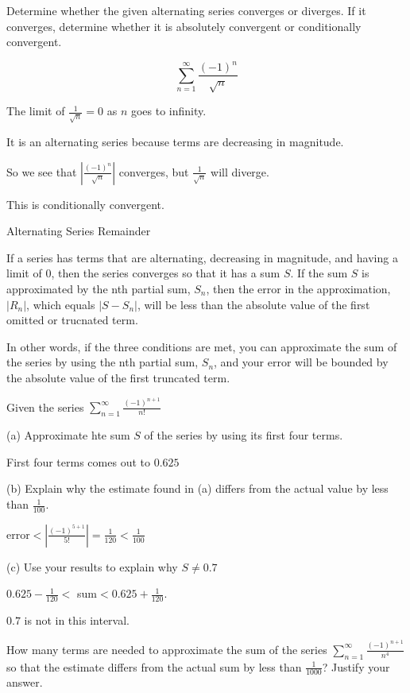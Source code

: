 \documentclass[../bccalc.tex]{subfiles}
\begin{document}
\pagebreak
\begin{example}
    Determine whether the given alternating series converges or diverges. If it converges, determine whether it is absolutely convergent or conditionally convergent.

    \[ \sum_{n=1}^{\infty}\frac{(-1)^n}{\sqrt{n}} \]

    The limit of $\frac{1}{\sqrt{n}}=0$ as $n$ goes to infinity.

    It is an alternating series because terms are decreasing in magnitude.

    So we see that $\left| \frac{(-1)^n}{\sqrt{n}}\right|$ converges, but $\frac{1}{\sqrt{n}}$ will diverge.

    This is conditionally convergent.
\end{example}

Alternating Series Remainder 

If a series has terms that are alternating, decreasing in magnitude, and having a limit of 0, then the series converges so that it has a sum $S$. If the sum $S$ is approximated by the nth partial sum, $S_n$, then the error in the approximation, $|R_n|$, which equals $|S-S_n|$, will be less than the absolute value of the first omitted or trucnated term.

In other words, if the three conditions are met, you can approximate the sum of the series by using the nth partial sum, $S_n$, and your error will be bounded by the absolute value of the first truncated term.

\begin{example}
    Given the series $\sum_{n=1}^{\infty} \frac{(-1)^{n+1}}{n!}$

    (a) Approximate hte sum $S$ of the series by using its first four terms.

    First four terms comes out to $0.625$

    (b) Explain why the estimate found in (a) differs from the actual value by less than $\frac{1}{100}$.

    error$<\left|\frac{(-1)^{5+1}}{5!}\right| = \frac{1}{120}<\frac{1}{100}$

    (c) Use your results to explain why $S\neq 0.7$

    $0.625-\frac{1}{120} < $ sum$<0.625+\frac{1}{120}$.

    $0.7$ is not in this interval.
\end{example}

\ex How many terms are needed to approximate the sum of the series $\sum_{n=1}^{\infty}\frac{(-1)^{n+1}}{n^4}$ so that the estimate differs from the actual sum by less than $\frac{1}{1000}$? Justify your answer.
\end{document}
